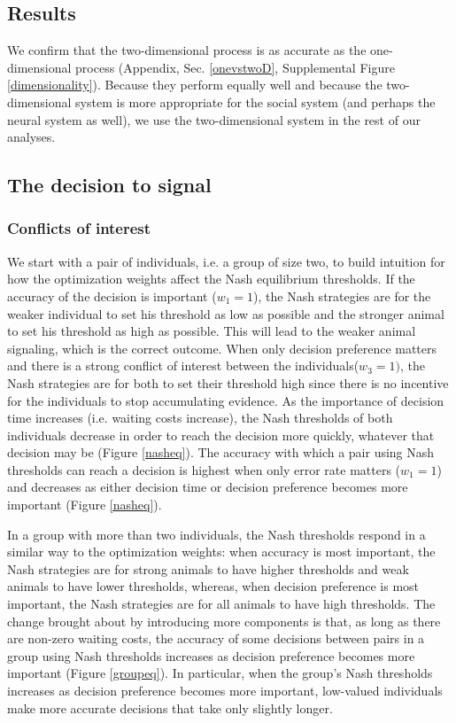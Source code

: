 \documentclass{pnastwo}
\begin{document}
\begin{article}
\section{Results}
 We confirm that the two-dimensional process is as accurate as the one-dimensional process (Appendix, Sec. \ref{onevstwoD}, Supplemental Figure \ref{dimensionality}). Because they perform equally well and because the two-dimensional system is more appropriate for the social system (and perhaps the neural system as well), we use the two-dimensional system in the rest of our analyses. 


\subsection{The decision to signal}
\subsubsection{Conflicts of interest}
We start with a pair of individuals, i.e. a group of size two, to build intuition for how the optimization weights affect the Nash equilibrium thresholds.  If the accuracy of the decision is important ($w_1=1$), the Nash strategies are for the weaker individual to set his threshold as low as possible and the stronger animal to set his threshold as high as possible. This will lead to the weaker animal signaling, which is the correct outcome. When only decision preference matters and there is a strong conflict of interest between the individuals($w_3=1)$, the Nash strategies are for both to set their threshold high since there is no incentive for the individuals to stop accumulating evidence. As the importance of decision time increases (i.e. waiting costs increase), the Nash thresholds of both individuals decrease in order to reach the decision more quickly, whatever that decision may be (Figure \ref{nasheq}). The accuracy with which a pair using Nash thresholds can reach a decision is highest when only error rate matters ($w_1=1$) and decreases as either decision time or decision preference becomes more important (Figure \ref{nasheq}).  


In a group with more than two individuals, the Nash thresholds respond in a similar way to the optimization weights: when accuracy is most important, the Nash strategies are for strong animals to have higher thresholds and weak animals to have lower thresholds, whereas, when decision preference is most important, the Nash strategies are for all animals to have high thresholds. The change brought about by introducing more components is that, as long as there are non-zero waiting costs, the accuracy of some decisions between pairs in a group using Nash thresholds increases as decision preference becomes more important (Figure \ref{groupeq}).  In particular, when the group's Nash thresholds increases as decision preference becomes more important, low-valued individuals make more accurate decisions that take only slightly longer.  


\end{article}
\end{document}
